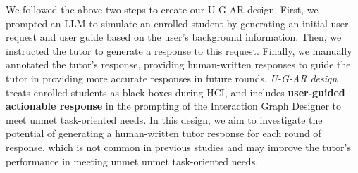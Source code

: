 \documentclass{article} %
\theoremstyle{definition}
\begin{document}
We followed the above two steps to create our U-G-AR design. First, we prompted an LLM to simulate an enrolled student by generating an initial user request and user guide based on the user's background information. Then, we instructed the tutor to generate a response to this request. Finally, we manually annotated the tutor's response, providing human-written responses to guide the tutor in providing more accurate responses in future rounds.
\textit{U-G-AR design} treats enrolled students as black-boxes during HCI, and includes \colorbox{methodcolor}{\textbf{user-guided actionable response}} in the prompting of the Interaction Graph Designer to meet unmet task-oriented needs. In this design, we aim to investigate the potential of generating a human-written tutor response for each round of response, which is not common in previous studies and may improve the tutor's performance in meeting unmet unmet task-oriented needs.
\end{document}
